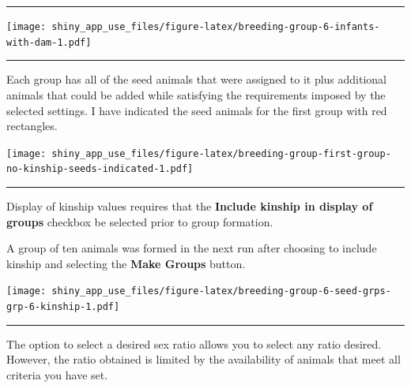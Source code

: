 \documentclass[
]{article}
\begin{document}
\begin{center}\rule{0.5\linewidth}{\linethickness}\end{center}

\texttt{[image: shiny\_app\_use\_files/figure-latex/breeding-group-6-infants-with-dam-1.pdf]}

\begin{center}\rule{0.5\linewidth}{\linethickness}\end{center}

Each group has all of the seed animals that were assigned to it plus
additional animals that could be added while satisfying the requirements
imposed by the selected settings. I have indicated the seed animals for
the first group with red rectangles.

\texttt{[image: shiny\_app\_use\_files/figure-latex/breeding-group-first-group-no-kinship-seeds-indicated-1.pdf]}

\begin{center}\rule{0.5\linewidth}{\linethickness}\end{center}

Display of kinship values requires that the \textbf{Include kinship in
display of groups} checkbox be selected prior to group formation.

A group of ten animals was formed in the next run after choosing to
include kinship and selecting the \textbf{Make Groups} button.

\texttt{[image: shiny\_app\_use\_files/figure-latex/breeding-group-6-seed-grps-grp-6-kinship-1.pdf]}

\begin{center}\rule{0.5\linewidth}{\linethickness}\end{center}

The option to select a desired sex ratio allows you to select any ratio
desired. However, the ratio obtained is limited by the availability of
animals that meet all criteria you have set.
\end{document}
